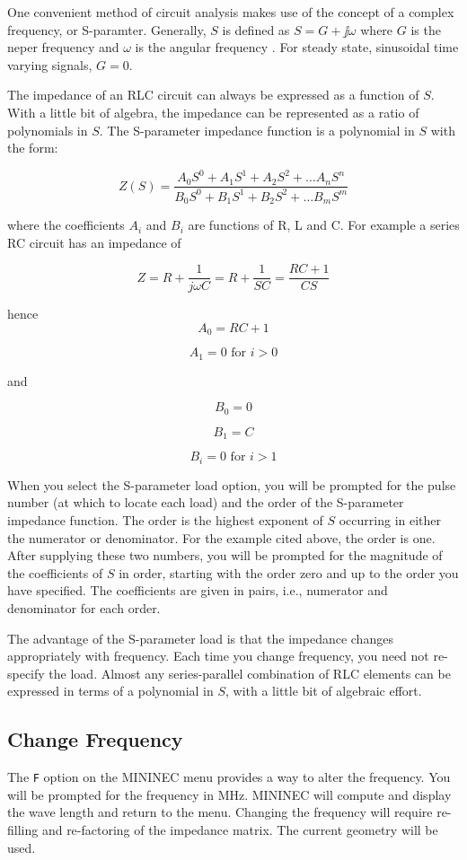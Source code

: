 \documentclass[12pt]{article}
\begin{document}
One convenient method of circuit analysis makes use of the concept of a
complex frequency, or S-paramter. Generally, $S$ is defined as
$S=G+\jj\omega$ where $G$ is the neper frequency and $\omega$ is the
angular frequency \cite{r24}. For steady state, sinusoidal
time varying signals, $G=0$.

The impedance of an RLC circuit can always be expressed as a function of
$S$. With a little bit of algebra, the impedance can be represented as a
ratio of polynomials in $S$. The S-parameter impedance function is a
polynomial in $S$ with the form:

\[ Z(S) = \frac{A_0S^0+A_1S^1+A_2S^2+\ldots A_nS^n}
               {B_0S^0+B_1S^1+B_2S^2+\ldots B_mS^m}
\]

where the coefficients $A_i$ and $B_i$ are functions of R, L and C. For
example a series RC circuit has an impedance of

\[ Z = R + \frac{1}{j\omega C} = R + \frac{1}{SC} = \frac{RC+1}{CS}
\]

hence
\[A_0 = RC + 1 \]

\[A_1 = 0 \mbox{ for }i > 0 \]

and

\[B_0 = 0\]

\[B_1 = C\]

\[B_i = 0 \mbox{ for }i>1\]

When you select the S-parameter load option, you will be prompted for
the pulse number (at which to locate each load) and the order of the
S-parameter impedance function. The order is the highest exponent of $S$
occurring in either the numerator or denominator. For the example cited
above, the order is one. After supplying these two numbers, you will be
prompted for the magnitude of the coefficients of $S$ in order, starting
with the order zero and up to the order you have specified. The
coefficients are given in pairs, i.e., numerator and denominator for
each order.

The advantage of the S-parameter load is that the impedance changes
appropriately with frequency. Each time you change frequency, you need
not re-specify the load. Almost any series-parallel combination of RLC
elements can be expressed in terms of a polynomial in $S$, with a little
bit of algebraic effort.

\subsection{Change Frequency}
The \verb+F+ option on the MININEC menu provides a way to alter the
frequency. You will be prompted for the frequency in MHz. MININEC will
compute and display the wave length and return to the menu. Changing the
frequency will require re-filling and re-factoring of the impedance
matrix. The current geometry will be used.
\end{document}
